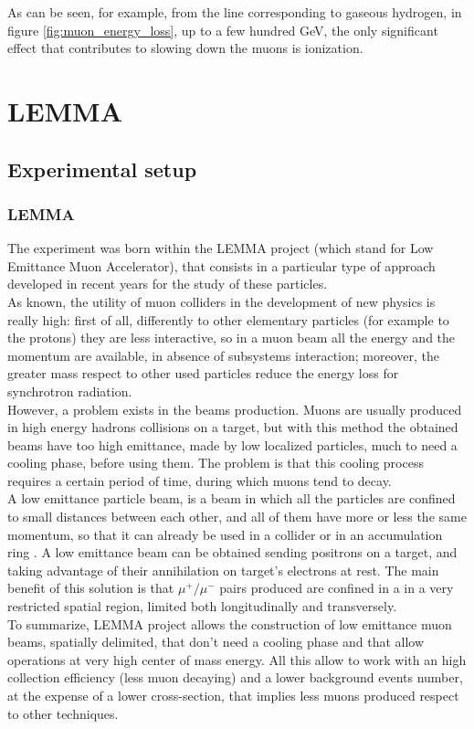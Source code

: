 \documentclass[a4paper,11pt]{book}
\begin{document}
As can be seen, for example, from the line corresponding to gaseous hydrogen, in figure \ref{fig:muon_energy_loss}, up to a few hundred GeV, the only significant effect that contributes to slowing down the muons is ionization.\\



\part{LEMMA}

\chapter{Experimental setup}
\label{ch:exp_setup}

\section{LEMMA}
The experiment was born within the LEMMA project (which stand for Low Emittance Muon Accelerator), that consists in a particular type of approach developed in recent years for the study of these particles.\\
As known, the utility of muon colliders in the development of new physics is really high: first of all, differently to other elementary particles (for example to the protons) they are less interactive, so in a muon beam all the energy and the momentum are available, in absence of subsystems interaction; moreover, the greater mass respect to other used particles reduce the energy loss for synchrotron radiation.\\
However, a problem exists in the beams production. Muons are usually produced in high energy hadrons collisions on a target, but with this method the obtained beams have too high emittance, made by low localized particles, much to need a cooling phase, before using them. The problem is that this cooling process requires a certain period of time, during which muons tend to decay.\\
A low emittance particle beam, is a beam in which all the particles are confined to small distances between each other, and all of them have more or less the same momentum, so that it can already be used in a collider or in an accumulation ring \cite{bib:low_emittance_muon_collider}. A low emittance beam can be obtained sending positrons on a target, and taking advantage of their annihilation on target's electrons at rest. The main benefit of this solution is that $\mu^+/\mu^-$ pairs produced are confined in a in a very restricted spatial region, limited both longitudinally and transversely.\\
To summarize, LEMMA project \cite{bib:LEMMA} allows the construction of low emittance muon beams, spatially delimited, that don't need a cooling phase and that allow operations at very high center of mass energy. All this allow to work with an high collection efficiency (less muon decaying) and a lower background events number, at the expense of a lower cross-section, that implies less muons produced respect to other techniques.\\
\end{document}
